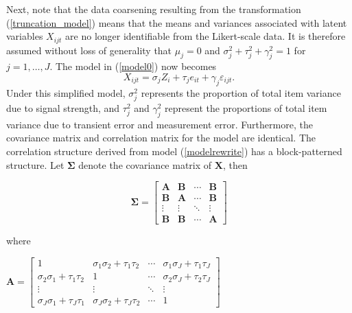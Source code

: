 \documentclass[12pt]{article}
\begin{document}
Next, note that the data coarsening resulting from the transformation (\ref{truncation_model}) means that the means and variances associated with latent variables $X_{ijt}$ are no longer identifiable from the Likert-scale
data. It is therefore assumed without loss of generality that $\mu_{j}=0$
and $\sigma^2_j + \tau^2_j + \gamma^2_j = 1$ for $j=1,\ldots,J$. The model in (\ref{model0}) now becomes 
\begin{equation}  \label{modelrewrite}
X_{ijt}=\sigma_j Z_i + \tau_j e_{it} +\gamma_j \varepsilon_{ijt}.
\end{equation}
Under this simplified model, $\sigma_j^2$ represents the proportion of total item variance due to signal strength, and $\tau_j^2$ and $\gamma_j^2$ represent the proportions of total item variance due to transient error and measurement error. Furthermore, the covariance matrix and correlation matrix for the model are identical. The correlation structure derived from model (\ref{modelrewrite}) has a block-patterned structure. Let $\boldsymbol{\Sigma}$ denote the covariance matrix of $\mathbf{X}$, then

\begin{center}
\begin{equation}  \label{sigmamat}
\boldsymbol{\Sigma} = \left[ 
\begin{array}{cccc}
\mathbf{A} & \mathbf{B} & \cdots & \mathbf{B} \\ 
\mathbf{B} & \mathbf{A} & \cdots & \mathbf{B} \\ 
\vdots & \vdots & \ddots & \vdots \\ 
\mathbf{B} & \mathbf{B} & \cdots & \mathbf{A}%
\end{array}
\right]
\end{equation}
\end{center}

where

\begin{center}
$\mathbf{A} = \left[ 
\begin{array}{cccc}
1 & \sigma_1 \sigma_2 + \tau_1 \tau_2 & \cdots & \sigma_1 \sigma_J + \tau_1
\tau_J \\ 
\sigma_2 \sigma_1 + \tau_1 \tau_2 & 1 & \cdots & \sigma_2 \sigma_J + \tau_2
\tau_J \\ 
\vdots & \vdots & \ddots & \vdots \\ 
\sigma_J \sigma_1 + \tau_J \tau_1 & \sigma_J \sigma_2 + \tau_J \tau_2 & 
\cdots & 1%
\end{array}
\right]$
\end{center}
\end{document}
